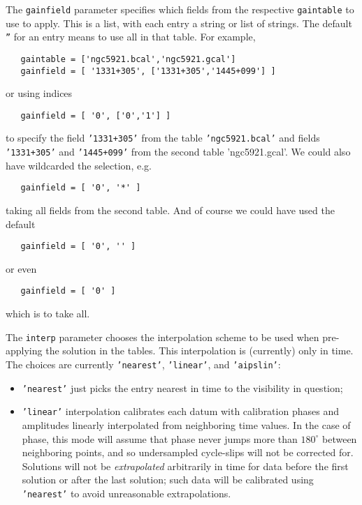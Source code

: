 {The {\tt gainfield} parameter specifies which fields from the
respective {\tt gaintable} to use to apply.  This is a list,
with each entry a string or list of strings.  The default 
{\tt ''} for an entry means to use all in that table.  For
example,
\small
\begin{verbatim}
   gaintable = ['ngc5921.bcal','ngc5921.gcal']
   gainfield = [ '1331+305', ['1331+305','1445+099'] ]
\end{verbatim}
\normalsize
or using indices
\small
\begin{verbatim}
   gainfield = [ '0', ['0','1'] ]
\end{verbatim}
\normalsize
to specify the field {\tt '1331+305'} from the table 
{\tt 'ngc5921.bcal'} and fields {\tt '1331+305'} and 
{\tt '1445+099'} from the second table 'ngc5921.gcal'.
We could also have wildcarded the selection, e.g.
\small
\begin{verbatim}
   gainfield = [ '0', '*' ]
\end{verbatim}
\normalsize
taking all fields from the second table.  And of course we could have
used the default
\small
\begin{verbatim}
   gainfield = [ '0', '' ]
\end{verbatim}
\normalsize
or even
\small
\begin{verbatim}
   gainfield = [ '0' ]
\end{verbatim}
\normalsize
which is to take all.

The {\tt interp} parameter chooses the interpolation scheme to be used
when pre-applying the solution in the tables.  This interpolation is
(currently) only in time.
The choices are currently {\tt 'nearest'}, {\tt 'linear'}, and {\tt 'aipslin'}:
\begin{itemize}
\item {\tt 'nearest'} just picks the entry nearest in time to the
   visibility in question;

\item {\tt 'linear'} interpolation calibrates each datum with
   calibration phases and amplitudes linearly 
   interpolated from neighboring time values. In the case of phase,
   this mode will assume that phase never jumps more than $180^\circ$
   between neighboring points, and so undersampled cycle-slips will
   not be corrected for.  Solutions will not be {\em extrapolated}
   arbitrarily in time for data before the first solution or after
   the last solution; such data will be calibrated using {\tt
   'nearest'} to avoid unreasonable extrapolations.



\end{itemize}}

